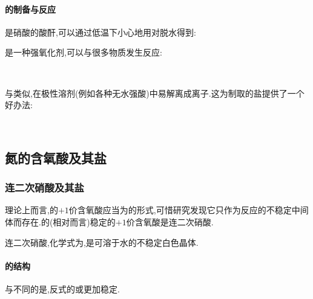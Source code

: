 \documentclass{ctexart}
\begin{document}
\paragraph{的制备与反应}
是硝酸的酸酐,可以通过低温下小心地用对脱水得到:
\begin{center}
\end{center}
\indent {}是一种强氧化剂,可以与很多物质发生反应:
\begin{center}
    \\
\end{center}
\indent 与类似,在极性溶剂(例如各种无水强酸)中易解离成离子.这为制取的盐提供了一个好办法:
\begin{center}
    \\
\end{center}
\subsection{氮的含氧酸及其盐}
\subsubsection{连二次硝酸及其盐}
理论上而言,的$+1$价含氧酸应当为的形式,可惜研究发现它只作为反应的不稳定中间体而存在.的(相对而言)稳定的$+1$价含氧酸是连二次硝酸.
\begin{substance}[\ce{H2N2O2}]
    连二次硝酸,化学式为,是可溶于水的不稳定白色晶体.
\end{substance}
\paragraph{的结构}
与不同的是,反式的或更加稳定.
\end{document}
